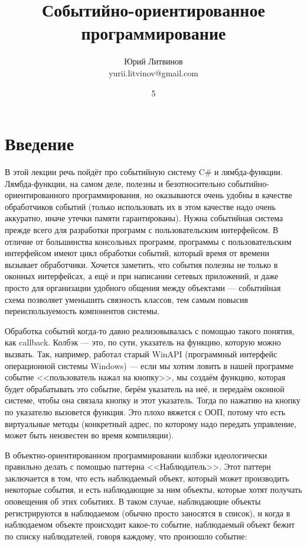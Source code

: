 \documentclass[a5paper]{article}
\title{Событийно-ориентированное программирование}
\author{Юрий Литвинов\\\small{yurii.litvinov@gmail.com}}
\date{5}
\begin{document}
\maketitle
\thispagestyle{empty}

\section{Введение}

В этой лекции речь пойдёт про событийную систему C\# и лямбда-функции. Лямбда-функции, на самом деле, полезны и безотносительно событийно-ориентированного программирования, но оказываются очень удобны в качестве обработчиков событий (только использовать их в этом качестве надо очень аккуратно, иначе утечки памяти гарантированы). Нужна событийная система прежде всего для разработки программ с пользовательским интерфейсом. В отличие от большинства консольных программ, программы с пользовательским интерфейсом имеют цикл обработки событий, который время от времени вызывает обработчики. Хочется заметить, что события полезны не только в оконных интерфейсах, а ещё и при написании сетевых приложений, и даже просто для организации удобного общения между объектами --- событийная схема позволяет уменьшить связность классов, тем самым повысив переиспользуемость компонентов системы.

Обработка событий когда-то давно реализовывалась с помощью такого понятия, как callback. Колбэк --- это, по сути, указатель на функцию, которую можно вызвать. Так, например, работал старый WinAPI (программный интерфейс операционной системы Windows) --- если мы хотим ловить в нашей программе событие <<пользователь нажал на кнопку>>, мы создаём функцию, которая будет обрабатывать это событие, берём указатель на неё, и передаём оконной системе, чтобы она связала кнопку и этот указатель. Тогда по нажатию на кнопку по указателю вызовется функция. Это плохо вяжется с ООП, потому что есть виртуальные методы (конкретный адрес, по которому надо передать управление, может быть неизвестен во время компиляции).

В объектно-ориентированном программировании колбэки идеологически правильно делать с помощью паттерна <<Наблюдатель>>. Этот паттерн заключается в том, что есть наблюдаемый объект, который может производить некоторые события, и есть наблюдающие за ним объекты, которые хотят получать оповещения об этих событиях. В таком случае, наблюдающие объекты регистрируются в наблюдаемом (обычно просто заносятся в список), и когда в наблюдаемом объекте происходит какое-то событие, наблюдаемый объект бежит по списку наблюдателей, говоря каждому, что произошло событие:
\end{document}
